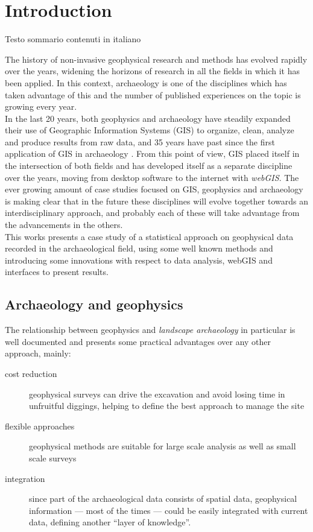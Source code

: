 \chapter{Introduction}

    \begin{chaptersum}
        Testo sommario contenuti in italiano
    \end{chaptersum}

    The history of non-invasive geophysical research and methods has evolved rapidly over the years, widening the horizons of research in all the fields in which it has been applied. In this context, archaeology is one of the disciplines which has taken advantage of this and the number of published experiences on the topic is growing every year.\\
    In the last 20 years, both geophysics and archaeology have steadily expanded their use of Geographic Information Systems (GIS) to organize, clean, analyze and produce results from raw data, and 35 years have past since the first application of GIS in archaeology \cite[pp.~2--3]{kvamme1995}. From this point of view, GIS placed itself in the intersection of both fields and has developed itself as a separate discipline over the years, moving from desktop software to the internet with \emph{webGIS}. The ever growing amount of case studies focused on GIS, geophysics and archaeology is making clear that in the future these disciplines will evolve together towards an interdisciplinary approach, and probably each of these will take advantage from the advancements in the others.\\
    This works presents a case study of a statistical approach on geophysical data recorded in the archaeological field, using some well known methods and introducing some innovations with respect to data analysis, webGIS and interfaces to present results. 
    \section{Archaeology and geophysics}
        The relationship between geophysics and \emph{landscape archaeology} in particular is well documented and presents some practical advantages over any other approach, mainly:
        \begin{description}
            \item[cost reduction] geophysical surveys can drive the excavation and avoid losing time in unfruitful diggings, helping to define the best approach to manage the site
            \item[flexible approaches] geophysical methods are suitable for large scale analysis as well as small scale surveys
            \item[integration] since part of the archaeological data consists of spatial data, geophysical information --- most of the times --- could be easily integrated with current data, defining another ``layer of knowledge''.
        \end{description}

